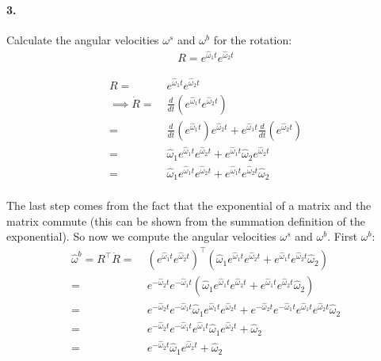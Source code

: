\documentclass[english]{article}
\begin{document}
\paragraph{3.}

Calculate the angular velocities $\omega^s$ and $\omega^b$ for the rotation:
\begin{align}
R = e^{\hat{\omega}_1 t} e^{\hat{\omega}_2 t}
\end{align}

\begin{align*}
               R = &\;  e^{\hat{\omega}_1 t} e^{\hat{\omega}_2 t} \\
\implies \dot{R} = &\; \frac{d}{dt}(e^{\hat{\omega}_1 t} e^{\hat{\omega}_2 t}) \\
  = &\; \frac{d}{dt}(e^{\hat{\omega}_1 t}) e^{\hat{\omega}_2 t} + e^{\hat{\omega}_1 t} \frac{d}{dt}(e^{\hat{\omega}_2 t}) \\
  = &\; \hat{\omega}_1 e^{\hat{\omega}_1 t} e^{\hat{\omega}_2 t} + e^{\hat{\omega}_1 t} \hat{\omega}_2 e^{\hat{\omega}_2 t} \\
  = &\; \hat{\omega}_1 e^{\hat{\omega}_1 t} e^{\hat{\omega}_2 t} + e^{\hat{\omega}_1 t} e^{\hat{\omega}_2 t} \hat{\omega}_2 \\
\end{align*}

The last step comes from the fact that the exponential of a matrix and the matrix commute (this can be shown from the summation definition of the exponential). So now we compute the angular velocities $\omega^s$ and $\omega^b$. First $\omega^b$:
\begin{align*}
\hat{\omega}^b = R^\top \dot{R} =&\; \left( e^{\hat{\omega}_1 t} e^{\hat{\omega}_2 t} \right)^\top \left(\hat{\omega}_1 e^{\hat{\omega}_1 t} e^{\hat{\omega}_2 t} + e^{\hat{\omega}_1 t} e^{\hat{\omega}_2 t} \hat{\omega}_2\right) \\
 =&\;  e^{-\hat{\omega}_2 t} e^{-\hat{\omega}_1 t} \left(\hat{\omega}_1 e^{\hat{\omega}_1 t} e^{\hat{\omega}_2 t} + e^{\hat{\omega}_1 t} e^{\hat{\omega}_2 t} \hat{\omega}_2\right) \\
 =&\;  e^{-\hat{\omega}_2 t} e^{-\hat{\omega}_1 t} \hat{\omega}_1 e^{\hat{\omega}_1 t} e^{\hat{\omega}_2 t} + e^{-\hat{\omega}_2 t} e^{-\hat{\omega}_1 t} e^{\hat{\omega}_1 t} e^{\hat{\omega}_2 t} \hat{\omega}_2 \\
 =&\; e^{-\hat{\omega}_2 t} e^{-\hat{\omega}_1 t} e^{\hat{\omega}_1 t} \hat{\omega}_1 e^{\hat{\omega}_2 t} + \hat{\omega}_2 \\
 =&\; e^{-\hat{\omega}_2 t} \hat{\omega}_1 e^{\hat{\omega}_2 t} + \hat{\omega}_2 \\
\end{align*}
\end{document}
